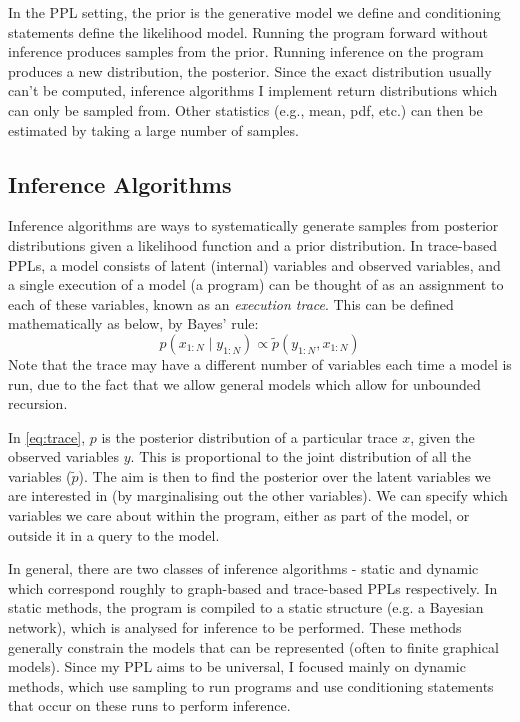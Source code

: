 In the PPL setting, the prior is the generative model we define and conditioning statements define the likelihood model. Running the program forward without inference produces samples from the prior. Running inference on the program produces a new distribution, the posterior. Since the exact distribution usually can't be computed, inference algorithms I implement return distributions which can only be sampled from. Other statistics (e.g., mean, pdf, etc.) can then be estimated by taking a large number of samples.
		
\subsection{Inference Algorithms}
				
	
Inference algorithms are ways to systematically generate samples from posterior distributions given a likelihood function and a prior distribution. In trace-based PPLs, a model consists of latent (internal) variables and observed variables, and a single execution of a model (a program) can be thought of as an assignment to each of these variables, known as an \textit{execution trace}. This can be defined mathematically as below, by Bayes' rule:
% 
\begin{equation} \label{eq:trace}
	p(x_{1:N}\mid y_{1:N})\propto \tilde{p}(y_{1:N},x_{1:N})
\end{equation}
% 
Note that the trace may have a different number of variables each time a model is run, due to the fact that we allow general models which allow for unbounded recursion. 
	
In \eqref{eq:trace}, $p$ is the posterior distribution of a particular trace $x$, given the observed variables $y$. This is proportional to the joint distribution of all the variables ($\tilde{p}$). The aim is then to find the posterior over the latent variables we are interested in (by marginalising out the other variables). We can specify which variables we care about within the program, either as part of the model, or outside it in a query to the model.
	
In general, there are two classes of inference algorithms - static and dynamic \cite{gordon2014probabilistic} which correspond roughly to graph-based and trace-based PPLs respectively. In static methods, the program is compiled to a static structure (e.g. a Bayesian network), which is analysed for inference to be performed. These methods generally constrain the models that can be represented (often to finite graphical models). Since my PPL aims to be universal, I focused mainly on dynamic methods, which use sampling to run programs and use conditioning statements that occur on these runs to perform inference.
	
